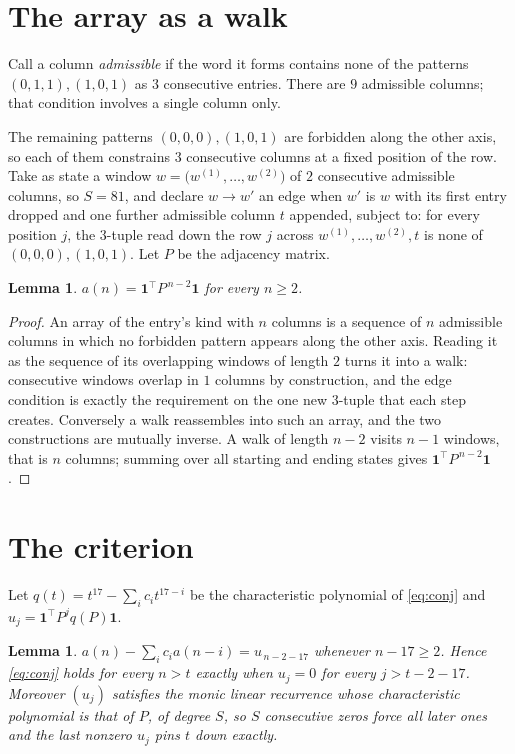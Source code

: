 \documentclass[11pt,a4paper]{article}
\theoremstyle{plain}
\newtheorem{lemma}[theorem]{Lemma}
\theoremstyle{definition}
\begin{document}
\section{The array as a walk}

Call a column \emph{admissible} if the word it forms contains none of the patterns
$(0,1,1), (1,0,1)$ as $3$ consecutive entries. There are $9$ admissible columns; that condition
involves a single column only.

The remaining patterns $(0,0,0), (1,0,1)$ are forbidden along the other axis, so each of them
constrains $3$ consecutive columns at a fixed position of the row. Take as state a
window $w=\bigl(w^{(1)},\dots,w^{(2)}\bigr)$ of $2$ consecutive admissible
columns, so $S=81$, and declare $w\to w'$ an edge when $w'$ is $w$ with its first entry
dropped and one further admissible column $t$ appended, subject to: for every position
$j$, the $3$-tuple read down the row $j$ across $w^{(1)},\dots,w^{(2)},t$
is none of $(0,0,0), (1,0,1)$. Let $P$ be the adjacency matrix.

\begin{lemma}\label{lem:walk}
$a(n)=\mathbf{1}^{\!\top}P^{\,n-2}\mathbf{1}$ for every $n\ge2$.
\end{lemma}

\begin{proof}
An array of the entry's kind with $n$ columns is a sequence of $n$ admissible columns in
which no forbidden pattern appears along the other axis. Reading it as the sequence of its
overlapping windows of length $2$ turns it into a walk: consecutive windows overlap in
$1$ columns by construction, and the edge condition is exactly the requirement on the one
new $3$-tuple that each step creates. Conversely a walk reassembles into such an array,
and the two constructions are mutually inverse. A walk of length $n-2$ visits $n-1$
windows, that is $n$ columns; summing over all starting and ending states gives
$\mathbf{1}^{\!\top}P^{\,n-2}\mathbf{1}$.
\end{proof}

\section{The criterion}

Let $q(t)=t^{17}-\sum_i c_i t^{17-i}$ be the characteristic polynomial of
\eqref{eq:conj} and $u_j=\mathbf{1}^{\!\top}P^{j}q(P)\mathbf{1}$.

\begin{lemma}\label{lem:crit}
$a(n)-\sum_i c_i a(n-i)=u_{\,n-2-17}$ whenever $n-17\ge2$. Hence
\eqref{eq:conj} holds for every $n>t$ exactly when $u_j=0$ for every
$j>t-2-17$. Moreover $(u_j)$ satisfies the monic linear recurrence whose
characteristic polynomial is that of $P$, of degree $S$, so $S$ consecutive zeros force all
later ones and the last nonzero $u_j$ pins $t$ down exactly.
\end{lemma}
\end{document}
